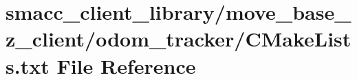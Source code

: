 \hypertarget{smacc__client__library_2move__base__z__client_2odom__tracker_2CMakeLists_8txt}{}\section{smacc\+\_\+client\+\_\+library/move\+\_\+base\+\_\+z\+\_\+client/odom\+\_\+tracker/\+C\+Make\+Lists.txt File Reference}
\label{smacc__client__library_2move__base__z__client_2odom__tracker_2CMakeLists_8txt}
